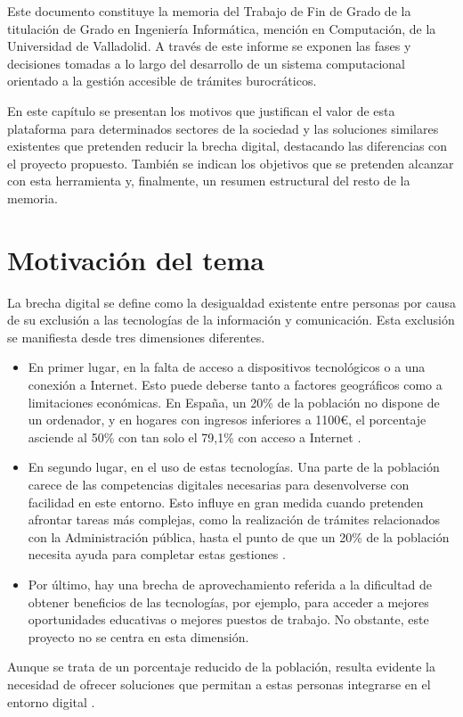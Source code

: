 Este documento constituye la memoria del Trabajo de Fin de Grado de la titulación de Grado en Ingeniería Informática, mención en Computación, de la Universidad de Valladolid. 
A través de este informe se exponen las fases y decisiones tomadas a lo largo del desarrollo de un sistema computacional orientado a la gestión accesible de trámites burocráticos.
    
En este capítulo se presentan los motivos que justifican el valor de esta plataforma para determinados sectores de la sociedad y las soluciones similares existentes que pretenden reducir la brecha digital, destacando las diferencias con el proyecto propuesto. 
También se indican los objetivos que se pretenden alcanzar con esta herramienta y, finalmente, un resumen estructural del resto de la memoria.

\section{Motivación del tema}
    La brecha digital se define como la desigualdad existente entre personas por causa de su exclusión a las tecnologías de la información y comunicación. 
    Esta exclusión se manifiesta desde tres dimensiones diferentes.
    \begin{itemize}
        \item En primer lugar, en la falta de acceso a dispositivos tecnológicos o a una conexión a Internet. 
            Esto puede deberse tanto a factores geográficos como a limitaciones económicas. 
            En España, un 20\% de la población no dispone de un ordenador, y en hogares con ingresos inferiores a 1100€, el porcentaje asciende al 50\% con tan solo el 79,1\% con acceso a Internet \cite{ref1}.
        \item En segundo lugar, en el uso de estas tecnologías. 
            Una parte de la población carece de las competencias digitales necesarias para desenvolverse con facilidad en este entorno. 
            Esto influye en gran medida cuando pretenden afrontar tareas más complejas, como la realización de trámites relacionados con la Administración pública, hasta el punto de que un 20\% de la población necesita ayuda para completar estas gestiones \cite{ref1}.
        \item Por último, hay una brecha de aprovechamiento referida a la dificultad de obtener beneficios de las tecnologías, por ejemplo, para acceder a mejores oportunidades educativas o mejores puestos de trabajo. 
            No obstante, este proyecto no se centra en esta dimensión.
    \end{itemize}
    Aunque se trata de un porcentaje reducido de la población, resulta evidente la necesidad de ofrecer soluciones que permitan a estas personas integrarse en el entorno digital \cite{ref1}.
    
